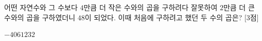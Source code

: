 어떤 자연수와 그 수보다 $4$만큼 더 작은 수와의 곱을 구하려다 잘못하여 $2$만큼 더 큰 수와의 곱을 구하였더니 $48$이 되었다. 이때 처음에 구하려고 했던 두 수의 곱은? \mbox{[3점]}
\begin{choices32}{$-4$}{$0$}{$6$}{$12$}{$32$}\end{choices32}
